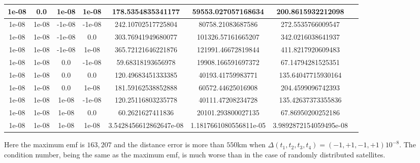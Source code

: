\documentclass[a4paper]{article}
\begin{document}
\begin{center}
\begin{longtable}{@{}c|@{}c|@{}c|@{}c|@{}c|@{}c|@{}cX@{}}
        1e-08 & 0.0 &1e-08 & 1e-08 & 178.5354835341177 & 59553.027057168634 & 200.8615932212098\\ \hline
        1e-08 & 1e-08 & -1e-08 & -1e-08 & 242.10702517725804 & 80758.21083687586 & 272.5535766009547\\ \hline
        1e-08 & 1e-08 & -1e-08 & 0.0 & 303.76941949680077 & 101326.57161665207 & 342.0216038641937\\ \hline
        1e-08 & 1e-08 & -1e-08 & 1e-08 & 365.72121646221876 & 121991.46672819844 & 411.8217920609483\\ \hline
        1e-08 & 1e-08 & 0.0 &-1e-08 & 59.68318193656978 & 19908.166591697372 & 67.14794281525351\\ \hline
        1e-08 & 1e-08 & 0.0 &0.0 & 120.49683451333385 & 40193.41759983771 & 135.64047715930164\\ \hline
        1e-08 & 1e-08 & 0.0 &1e-08 & 181.59162538852888 & 60572.44625016908 & 204.4599096742393\\ \hline
        1e-08 & 1e-08 & 1e-08 & -1e-08 & 120.25116803235778 & 40111.47208234728 & 135.42637373355836\\ \hline
        1e-08 & 1e-08 & 1e-08 & 0.0 & 60.2621627411836 & 20101.293800027135 & 67.86950200252186\\ \hline
        1e-08 & 1e-08 & 1e-08 & 1e-08 & 3.5428456612862647e-08 & 1.1817661080556811e-05 & 3.9892872154059495e-08\\ \hline
	\end{longtable}
\end{center}

Here the maximum emf is $163,207$ and the distance error is more than $550$km when $\Delta(t_1, t_2, t_3, t_4) = (-1, +1, -1, +1)10^{-8}$. The condition number, being the same as the maximum emf, is much worse than in the case of randomly distributed satellites.
\end{document}
